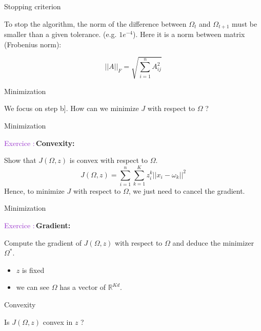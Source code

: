 \documentclass[usenames,dvipsnames]{beamer}
\newcounter{numexos}%
\newcommand{\exercice}[1]{%
\addtocounter{numexos}{1}%
\textcolor{DarkOrchid}{Exercice\,\thenumexos\,:}\,#1%
}
\begin{document}
\begin{frame}{Stopping criterion}
    
    To stop the algorithm, the norm of the difference between $\Omega_t$ and $\Omega_{t+1}$ must be smaller than a given tolerance. (e.g. $1e^{-4}$). Here it is a norm between matrix (Frobenius norm):

    \begin{equation}
	||A||_F = \sqrt{ \sum^{n}_{i=1} A_{ij}^2} 
    \end{equation}
    
\end{frame}

\begin{frame}{Minimization}

    We focus on step b]. How can we minimize $J$ with respect to $\Omega$ ?
    
\end{frame}

\begin{frame}{Minimization}

    \exercice{\textbf{Convexity:}}

    Show that $J(\Omega, z)$ is convex with respect to $ \Omega$.
\begin{equation}
    J(\Omega, z) = \sum^{n}_{i=1} \sum^{K}_{k=1} z_i^k||x_i-\omega_k||^2
\end{equation}
Hence, to minimize $J$ with respect to $\Omega$, we just need to cancel the gradient.
    
\end{frame}

\begin{frame}{Minimization}

    \exercice{\textbf{Gradient:}}
    \addtocounter{numexos}{-1}

    Compute the gradient of $J(\Omega, z)$ with respect to $\Omega$ and deduce the minimizer $\Omega^*$.
    \begin{itemize}
        \item $z$ is fixed
	\item we can see $\Omega$ has a vector of $ \mathbb{R}^{Kd}$.
    \end{itemize}
\end{frame}

\begin{frame}{Convexity}

    Is $J(\Omega, z)$ convex in $z$ ?
    
\end{frame}
\end{document}
